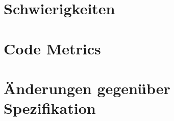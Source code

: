 \documentclass[a4paper,11pt]{article}
\begin{document}

    \tableofcontents


    \newpage

    

    \section{Schwierigkeiten}\label{sec:schwierigkeiten}
    

    \section{Code Metrics}\label{sec:metrics}
    

    \section{Änderungen gegenüber Spezifikation}\label{sec:aenderungen}
    
\end{document}
